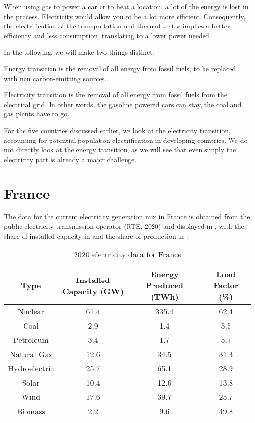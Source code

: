 When using gas to power a car or to heat a location, a lot of the energy is lost in the process. Electricity would allow you to be a lot more efficient. Consequently, the electrification of the transportation and thermal sector implies a better efficiency and less consumption, translating to a lower power needed.

In the following, we will make two things distinct:

\begin{kaobox}[frametitle=Energy Transition]
Energy transition is the removal of all energy from fossil fuels, to be replaced with non carbon-emitting sources.
\end{kaobox}

\begin{kaobox}[frametitle=Electricity Transition]
Electricity transition is the removal of all energy from fossil fuels from the electrical grid. In other words, the gasoline powered cars can stay, the coal and gas plants have to go.
\end{kaobox}


For the five countries discussed earlier, we look at the electricity transition, accounting for potential population electrification in developing countries. We do not directly look at the energy transition, as we will see that even simply the electricity part is already a major challenge.


\section{France}

The data for the current electricity generation mix in France is obtained from the public electricity transmission operator (RTE, 2020) and displayed in , with the share of installed capacity in  and the share of production in .

\begin{table*}[ht]
\caption[2020 electricity data for France]{2020 electricity data for France}
\begin{tabular}{ c c c c }
	\toprule
	Type & Installed Capacity (GW) & Energy Produced (TWh) & Load Factor (\%) \\
	\midrule
	Nuclear & 61.4 & 335.4 & 62.4\\
	Coal & 2.9 & 1.4 & 5.5\\
	Petroleum & 3.4 & 1.7 & 5.7\\
	Natural Gas & 12.6 & 34.5 & 31.3\\
	Hydroelectric & 25.7 & 65.1 & 28.9\\
	Solar & 10.4 & 12.6 & 13.8\\
	Wind & 17.6 & 39.7 & 25.7\\
	Biomass & 2.2 & 9.6 & 49.8\\
	\bottomrule
\end{tabular}
\end{table*}


